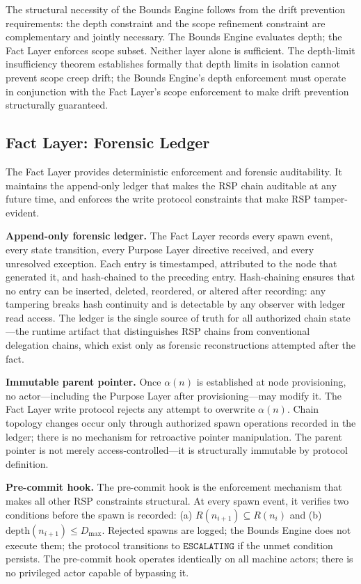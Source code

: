 The structural necessity of the Bounds Engine follows from the drift prevention requirements: the depth constraint and the scope refinement constraint are complementary and jointly necessary. The Bounds Engine evaluates depth; the Fact Layer enforces scope subset. Neither layer alone is sufficient. The depth-limit insufficiency theorem establishes formally that depth limits in isolation cannot prevent scope creep drift; the Bounds Engine's depth enforcement must operate in conjunction with the Fact Layer's scope enforcement to make drift prevention structurally guaranteed.

\subsection{Fact Layer: Forensic Ledger}
\label{sec:rs-fact-ledger}

The Fact Layer provides deterministic enforcement and forensic auditability. It maintains the append-only ledger that makes the RSP chain auditable at any future time, and enforces the write protocol constraints that make RSP tamper-evident.

\medskip
\noindent\textbf{Append-only forensic ledger.} The Fact Layer records every spawn event, every state transition, every Purpose Layer directive received, and every unresolved exception. Each entry is timestamped, attributed to the node that generated it, and hash-chained to the preceding entry. Hash-chaining ensures that no entry can be inserted, deleted, reordered, or altered after recording: any tampering breaks hash continuity and is detectable by any observer with ledger read access. The ledger is the single source of truth for all authorized chain state---the runtime artifact that distinguishes RSP chains from conventional delegation chains, which exist only as forensic reconstructions attempted after the fact.

\medskip
\noindent\textbf{Immutable parent pointer.} Once $\alpha(n)$ is established at node provisioning, no actor---including the Purpose Layer after provisioning---may modify it. The Fact Layer write protocol rejects any attempt to overwrite $\alpha(n)$. Chain topology changes occur only through authorized spawn operations recorded in the ledger; there is no mechanism for retroactive pointer manipulation. The parent pointer is not merely access-controlled---it is structurally immutable by protocol definition.

\medskip
\noindent\textbf{Pre-commit hook.} The pre-commit hook is the enforcement mechanism that makes all other RSP constraints structural. At every spawn event, it verifies two conditions before the spawn is recorded: (a) $R(n_{i+1}) \subseteq R(n_i)$ and (b) $\mathrm{depth}(n_{i+1}) \leq D_{\mathrm{max}}$. Rejected spawns are logged; the Bounds Engine does not execute them; the protocol transitions to $\texttt{ESCALATING}$ if the unmet condition persists. The pre-commit hook operates identically on all machine actors; there is no privileged actor capable of bypassing it.

